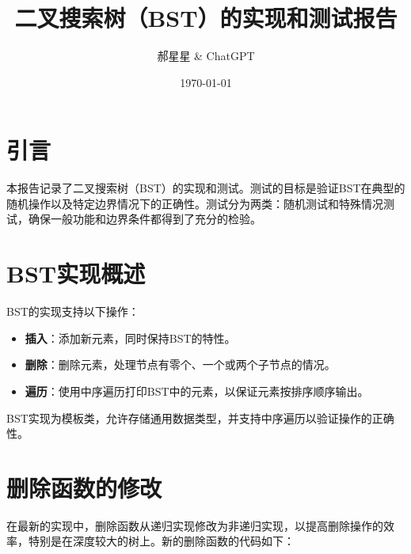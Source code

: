 \documentclass[UTF8]{ctexart}
\title{二叉搜索树（BST）的实现和测试报告}
\author{郝星星 \& ChatGPT}
\date{\today}
\begin{document}
\maketitle

\section{引言}
本报告记录了二叉搜索树（BST）的实现和测试。测试的目标是验证BST在典型的随机操作以及特定边界情况下的正确性。测试分为两类：随机测试和特殊情况测试，确保一般功能和边界条件都得到了充分的检验。

\section{BST实现概述}
BST的实现支持以下操作：
\begin{itemize}
    \item \textbf{插入}：添加新元素，同时保持BST的特性。
    \item \textbf{删除}：删除元素，处理节点有零个、一个或两个子节点的情况。
    \item \textbf{遍历}：使用中序遍历打印BST中的元素，以保证元素按排序顺序输出。
\end{itemize}
BST实现为模板类，允许存储通用数据类型，并支持中序遍历以验证操作的正确性。

\section{删除函数的修改}
在最新的实现中，删除函数从递归实现修改为非递归实现，以提高删除操作的效率，特别是在深度较大的树上。新的删除函数的代码如下：
\end{document}
